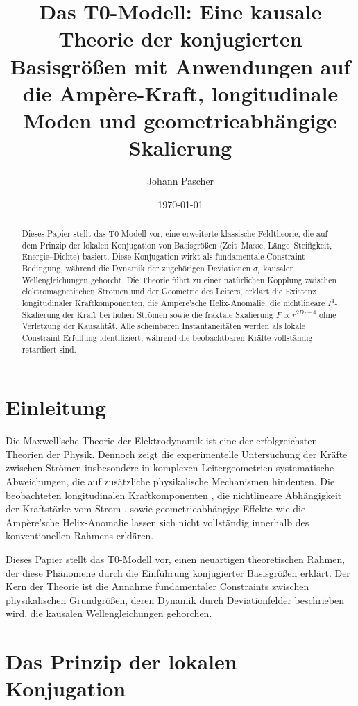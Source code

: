 \documentclass[10pt, a4paper]{article}
\title{Das T0-Modell: Eine kausale Theorie der konjugierten Basisgrößen mit Anwendungen auf die Ampère-Kraft, longitudinale Moden und geometrieabhängige Skalierung}
\author{Johann Pascher}
\date{\today}
\begin{document}
	
	\maketitle
	
	\begin{abstract}
		Dieses Papier stellt das T0-Modell vor, eine erweiterte klassische Feldtheorie, die auf dem Prinzip der lokalen Konjugation von Basisgrößen (Zeit--Masse, Länge--Steifigkeit, Energie--Dichte) basiert. Diese Konjugation wirkt als fundamentale Constraint-Bedingung, während die Dynamik der zugehörigen Deviationen $\sigma_i$ kausalen Wellengleichungen gehorcht. Die Theorie führt zu einer natürlichen Kopplung zwischen elektromagnetischen Strömen und der Geometrie des Leiters, erklärt die Existenz longitudinaler Kraftkomponenten, die Ampère'sche Helix-Anomalie, die nichtlineare $I^4$-Skalierung der Kraft bei hohen Strömen sowie die fraktale Skalierung $F \propto r^{2D_f - 4}$ ohne Verletzung der Kausalität. Alle scheinbaren Instantaneitäten werden als lokale Constraint-Erfüllung identifiziert, während die beobachtbaren Kräfte vollständig retardiert sind.
	\end{abstract}
	
	\section{Einleitung}
	Die Maxwell'sche Theorie der Elektrodynamik ist eine der erfolgreichsten Theorien der Physik. Dennoch zeigt die experimentelle Untersuchung der Kräfte zwischen Strömen insbesondere in komplexen Leitergeometrien systematische Abweichungen, die auf zusätzliche physikalische Mechanismen hindeuten. Die beobachteten longitudinalen Kraftkomponenten \cite{graneau1985}, die nichtlineare Abhängigkeit der Kraftstärke vom Strom \cite{graneau2001}, sowie geometrieabhängige Effekte wie die Ampère'sche Helix-Anomalie \cite{moore1988} lassen sich nicht vollständig innerhalb des konventionellen Rahmens erklären.
	
	Dieses Papier stellt das T0-Modell vor, einen neuartigen theoretischen Rahmen, der diese Phänomene durch die Einführung konjugierter Basisgrößen erklärt. Der Kern der Theorie ist die Annahme fundamentaler Constraints zwischen physikalischen Grundgrößen, deren Dynamik durch Deviationfelder beschrieben wird, die kausalen Wellengleichungen gehorchen.
	
	\section{Das Prinzip der lokalen Konjugation}
\end{document}
